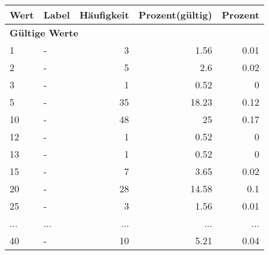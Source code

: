      \begin{longtable}{lXrrr}
     \toprule
     \textbf{Wert} & \textbf{Label} & \textbf{Häufigkeit} & \textbf{Prozent(gültig)} & \textbf{Prozent} \\
     \endhead
     \midrule
     \multicolumn{5}{l}{\textbf{Gültige Werte}}\\
        1 & \multicolumn{1}{X}{-} & %
          \num{3} &
          \num[round-mode=places,round-precision=2]{1,56} &
          \num[round-mode=places,round-precision=2]{0,01} \\
        2 & \multicolumn{1}{X}{-} & %
          \num{5} &
          \num[round-mode=places,round-precision=2]{2,6} &
          \num[round-mode=places,round-precision=2]{0,02} \\
        3 & \multicolumn{1}{X}{-} & %
          \num{1} &
          \num[round-mode=places,round-precision=2]{0,52} &
          \num[round-mode=places,round-precision=2]{0} \\
        5 & \multicolumn{1}{X}{-} & %
          \num{35} &
          \num[round-mode=places,round-precision=2]{18,23} &
          \num[round-mode=places,round-precision=2]{0,12} \\
        10 & \multicolumn{1}{X}{-} & %
          \num{48} &
          \num[round-mode=places,round-precision=2]{25} &
          \num[round-mode=places,round-precision=2]{0,17} \\
        12 & \multicolumn{1}{X}{-} & %
          \num{1} &
          \num[round-mode=places,round-precision=2]{0,52} &
          \num[round-mode=places,round-precision=2]{0} \\
        13 & \multicolumn{1}{X}{-} & %
          \num{1} &
          \num[round-mode=places,round-precision=2]{0,52} &
          \num[round-mode=places,round-precision=2]{0} \\
        15 & \multicolumn{1}{X}{-} & %
          \num{7} &
          \num[round-mode=places,round-precision=2]{3,65} &
          \num[round-mode=places,round-precision=2]{0,02} \\
        20 & \multicolumn{1}{X}{-} & %
          \num{28} &
          \num[round-mode=places,round-precision=2]{14,58} &
          \num[round-mode=places,round-precision=2]{0,1} \\
        25 & \multicolumn{1}{X}{-} & %
          \num{3} &
          \num[round-mode=places,round-precision=2]{1,56} &
          \num[round-mode=places,round-precision=2]{0,01} \\
       ... & ... & ... & ... & ... \\
        40 & \multicolumn{1}{X}{-} & %
          \num{10} &
          \num[round-mode=places,round-precision=2]{5,21} &
          \num[round-mode=places,round-precision=2]{0,04} \\


\end{longtable}
